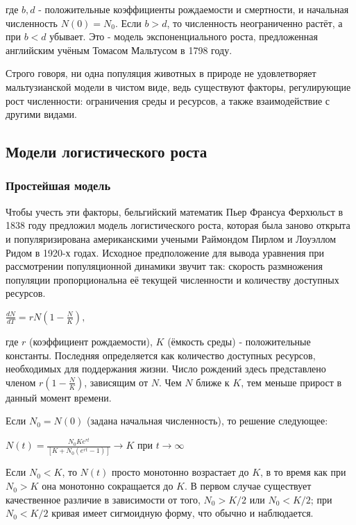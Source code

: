 \documentclass[a4paper, 14pt]{extarticle}
\begin{document}
где $b, d$ - положительные коэффициенты рождаемости и смертности, и начальная численность $N(0) = N_0$. Если $b>d$, то численность неограниченно растёт, а при $b<d$ убывает. Это - модель экспоненциального роста, предложенная английским учёным Томасом Мальтусом в 1798 году.

Строго говоря, ни одна популяция животных в природе не удовлетворяет мальтузианской модели в чистом виде, ведь существуют факторы, регулирующие рост численности: ограничения среды и ресурсов, а также взаимодействие с другими видами.

\subsection{Модели логистического роста}

\subsubsection{Простейшая модель}

Чтобы учесть эти факторы, бельгийский математик Пьер Франсуа Ферхюльст в 1838 году предложил модель логистического роста, которая была заново открыта и популяризирована американскими учеными Раймондом Пирлом и Лоуэллом Ридом в 1920-х годах. Исходное предположение для вывода уравнения при рассмотрении популяционной динамики звучит так: скорость размножения популяции пропорциональна её текущей численности и количеству доступных ресурсов.

\begin{center}
$\frac{dN}{dT} = rN(1-\frac{N}{K}),$
\end{center}

где $r$ (коэффициент рождаемости), $K$ (ёмкость среды) - положительные константы. Последняя определяется как количество доступных ресурсов, необходимых для поддержания жизни. Число рождений здесь представлено членом $r(1-\frac{N}{K})$, зависящим от $N$. Чем $N$ ближе к $K$, тем меньше прирост в данный момент времени. 

Если $N_0 = N(0)$ (задана начальная численность), то решение следующее:

\begin{center}
$N(t) = \frac{N_0Ke^{rt}}{[K+N_0(e^{rt}-1)]} \to K$ при $t \to \infty$
\end{center}

Если $N_0 < K$, то $N(t)$ просто монотонно возрастает до $K$, в то время как при $N_0 > K$ она монотонно сокращается до $K$. В первом случае существует качественное различие в зависимости от того, $N_0 > K/2$ или $N_0 < K/2$; при $N_0 < K/2$ кривая имеет сигмоидную форму, что обычно и наблюдается.
\end{document}
